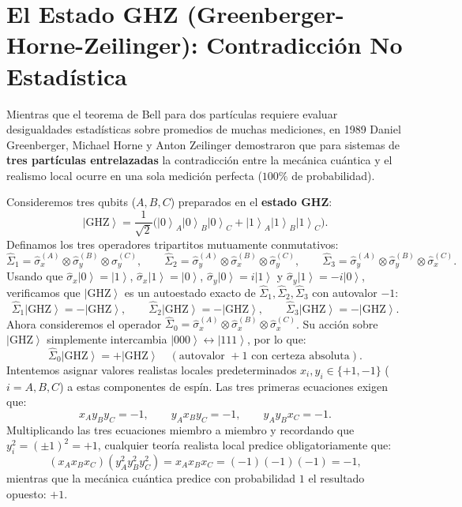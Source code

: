 \documentclass[11pt,a4paper,twoside]{report}
\theoremstyle{definition}
\theoremstyle{plain}
\theoremstyle{remark}
\newcommand{\ket}[1]{\left| #1 \right\rangle}
\newcommand{\op}[1]{\hat{#1}}
\begin{document}
\section{El Estado GHZ (Greenberger-Horne-Zeilinger): Contradicción No Estadística}

Mientras que el teorema de Bell para dos partículas requiere evaluar desigualdades estadísticas sobre promedios de muchas mediciones, en 1989 Daniel Greenberger, Michael Horne y Anton Zeilinger demostraron que para sistemas de \textbf{tres partículas entrelazadas} la contradicción entre la mecánica cuántica y el realismo local ocurre en una sola medición perfecta ($100\%$ de probabilidad).

Consideremos tres qubits ($A, B, C$) preparados en el \textbf{estado GHZ}:
\begin{equation}
    \ket{\text{GHZ}} = \frac{1}{\sqrt{2}}\big(\ket{0}_A\ket{0}_B\ket{0}_C + \ket{1}_A\ket{1}_B\ket{1}_C\big).
\end{equation}
Definamos los tres operadores tripartitos mutuamente conmutativos:
\begin{equation}
    \op{\Sigma}_1 = \op{\sigma}_x^{(A)} \otimes \op{\sigma}_y^{(B)} \otimes \op{\sigma}_y^{(C)}, \qquad \op{\Sigma}_2 = \op{\sigma}_y^{(A)} \otimes \op{\sigma}_x^{(B)} \otimes \op{\sigma}_y^{(C)}, \qquad \op{\Sigma}_3 = \op{\sigma}_y^{(A)} \otimes \op{\sigma}_y^{(B)} \otimes \op{\sigma}_x^{(C)}.
\end{equation}
Usando que $\op{\sigma}_x\ket{0} = \ket{1}$, $\op{\sigma}_x\ket{1} = \ket{0}$, $\op{\sigma}_y\ket{0} = i\ket{1}$ y $\op{\sigma}_y\ket{1} = -i\ket{0}$, verificamos que $\ket{\text{GHZ}}$ es un autoestado exacto de $\op{\Sigma}_1, \op{\Sigma}_2, \op{\Sigma}_3$ con autovalor $-1$:
\begin{equation}
    \op{\Sigma}_1\ket{\text{GHZ}} = -\ket{\text{GHZ}}, \qquad \op{\Sigma}_2\ket{\text{GHZ}} = -\ket{\text{GHZ}}, \qquad \op{\Sigma}_3\ket{\text{GHZ}} = -\ket{\text{GHZ}}.
\end{equation}
Ahora consideremos el operador $\op{\Sigma}_0 = \op{\sigma}_x^{(A)} \otimes \op{\sigma}_x^{(B)} \otimes \op{\sigma}_x^{(C)}$. Su acción sobre $\ket{\text{GHZ}}$ simplemente intercambia $\ket{000} \leftrightarrow \ket{111}$, por lo que:
\begin{equation}
    \op{\Sigma}_0\ket{\text{GHZ}} = +\ket{\text{GHZ}} \quad (\text{autovalor } +1 \text{ con certeza absoluta}).
\end{equation}
Intentemos asignar valores realistas locales predeterminados $x_i, y_i \in \{+1, -1\}$ ($i = A, B, C$) a estas componentes de espín. Las tres primeras ecuaciones exigen que:
\begin{equation}
    x_A y_B y_C = -1, \qquad y_A x_B y_C = -1, \qquad y_A y_B x_C = -1.
\end{equation}
Multiplicando las tres ecuaciones miembro a miembro y recordando que $y_i^2 = (\pm 1)^2 = +1$, cualquier teoría realista local predice obligatoriamente que:
\begin{equation}
    (x_A x_B x_C)(y_A^2 y_B^2 y_C^2) = x_A x_B x_C = (-1)(-1)(-1) = -1,
\end{equation}
mientras que la mecánica cuántica predice con probabilidad $1$ el resultado opuesto: $+1$.
\end{document}
